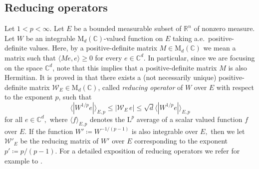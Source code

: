 \documentclass{article}
\theoremstyle{definition}
\theoremstyle{remark}
\numberwithin{equation}{section}
\newcommand{\mathdm}{\,\mathrm{dm}}
\newcommand{\cW}{\mathcal{W}}
\newcommand{\reals}{\mathbb{R}}
\newcommand{\complex}{\mathbb{C}}
\newcommand{\1}{\mathbf{1}}
\begin{document}
    \subsection{Reducing operators}
    \label{subsec:ReducingOperators}
    Let $1<p<\infty$. Let $E$ be a bounded measurable subset of $\reals^n$ of nonzero measure. Let $W$ be an integrable $\mathrm{M}_{d}(\complex)$-valued function on $E$ taking a.e.~positive-definite values.
    Here, by a positive-definite matrix $M \in \mathrm{M}_{d}(\complex)$
    we mean a matrix such that $\langle M e, e \rangle \geq 0$ for every $e \in \complex^d.$
    In particular, since we are focusing on the space $\complex^d$, note that this implies that a positive-definite matrix $M$ is also Hermitian.
    It is proved in \cite[Proposition 1.2]{Goldberg_2003} that there exists a (not necessarily unique) positive-definite matrix $\cW_{E}\in \mathrm{M}_{d}(\complex)$, called \emph{reducing operator} of $W$ over $E$ with respect to the exponent $p$, such that
    \begin{equation*}
        \langle|W^{1/p}e|\rangle_{E,p}\leq
        |\cW_{E}\, e| \leq
        \sqrt{d}\langle|W^{1/p}e|\rangle_{E,p}
    \end{equation*}
    for all $e \in \complex^d,$ where $\langle f\rangle_{E,p}$ denotes the $\mathrm{L}^{p}$ average of a scalar valued function $f$ over $E$. If the function $W' \coloneq W^{-1/(p-1)}$ is also integrable over $E,$ then we let $\cW'_{E}$ be the reducing matrix of $W'$ over $E$ corresponding to the exponent $p' \coloneq p/(p-1)$. For a detailed exposition of reducing operators we refer for example to \cite{DKPS2024}.
        
\end{document}
